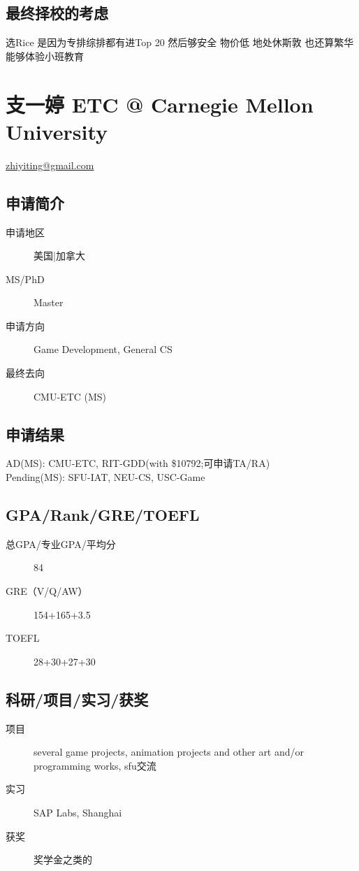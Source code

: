 \documentclass[11pt,fleqn,openany]{book} %
\begin{document}
\subsection*{最终择校的考虑}
选Rice 是因为专排综排都有进Top 20
然后够安全 物价低 地处休斯敦 也还算繁华
能够体验小班教育
\clearpage
\section{支一婷 ETC @ Carnegie Mellon University}
\hfill \href{mailto:zhiyiting@gmail.com}{zhiyiting@gmail.com}

\noindent\begin{minipage}[t]{0.45\textwidth}
\subsection*{申请简介}
\begin{description}
\item[申请地区] 美国|加拿大
\item[MS/PhD] Master
\item[申请方向] Game Development, General CS
\item[最终去向] CMU-ETC (MS)
\end{description}
\end{minipage}
\hfill
\begin{minipage}[t]{0.45\textwidth}
\subsection*{申请结果}
\noindent AD(MS): CMU-ETC, RIT-GDD(with \$10792;可申请TA/RA)\\
Pending(MS): SFU-IAT, NEU-CS, USC-Game
\end{minipage}
\subsection*{GPA/Rank/GRE/TOEFL}
\begin{description}
\item[总GPA/专业GPA/平均分] 84
\item[GRE（V/Q/AW）] 154+165+3.5
\item[TOEFL] 28+30+27+30
\end{description}

\subsection*{科研/项目/实习/获奖}
\begin{description}
\item[项目] several game projects, animation projects and other art and/or programming works, sfu交流
\item[实习] SAP Labs, Shanghai
\item[获奖] 奖学金之类的
\end{description}
\end{document}
